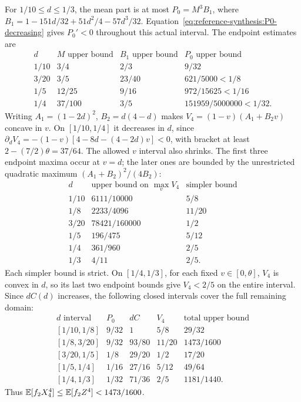 For $1/10\le d\le1/3$, the mean part is at most
$P_0=M^3B_1$, where $B_1=1-151d/32+51d^2/4-57d^3/32$.
Equation~\eqref{eq:reference-synthesis:P0-decreasing} gives
\(P_0'<0\) throughout this actual interval.
The endpoint estimates are
\[
\begin{array}{c|rrr}
d&M\text{ upper bound}&B_1\text{ upper bound}&P_0\text{ upper bound}\\\hline
1/10&3/4&2/3&9/32\\
3/20&3/5&23/40&621/5000<1/8\\
1/5&12/25&9/16&972/15625<1/16\\
1/4&37/100&3/5&151959/5000000<1/32.
\end{array}
\]
Writing $A_1=(1-2d)^2$, $B_2=d(4-d)$ makes $V_4=(1-v)(A_1+B_2v)$
concave in $v$. On $[1/10,1/4]$ it decreases in $d$, since
$\partial_dV_4=-(1-v)[4-8d-(4-2d)v]<0$, with bracket at least
$2-(7/2)\theta=37/64$. The allowed $v$ interval also shrinks.
The first three endpoint maxima occur at $v=d$; the later ones are
bounded by the unrestricted quadratic maximum $(A_1+B_2)^2/(4B_2)$:
\[
\begin{array}{c|rr}
d&\text{upper bound on }\max_vV_4&\text{simpler bound}\\\hline
1/10&6111/10000&5/8\\1/8&2233/4096&11/20\\
3/20&78421/160000&1/2\\1/5&196/475&5/12\\
1/4&361/960&2/5\\1/3&4/11&2/5.
\end{array}
\]
Each simpler bound is strict. On $[1/4,1/3]$, for each fixed
$v\in[0,\theta]$, $V_4$ is convex in $d$, so its last two endpoint
bounds give $V_4<2/5$ on the entire interval. Since $dC(d)$ increases,
the following closed intervals cover the full remaining domain:
\[
\begin{array}{c|rrrr}
d\text{ interval}&P_0&dC&V_4&\text{total upper bound}\\\hline
{}[1/10,1/8]&9/32&1&5/8&29/32\\
{}[1/8,3/20]&9/32&93/80&11/20&1473/1600\\
{}[3/20,1/5]&1/8&29/20&1/2&17/20\\
{}[1/5,1/4]&1/16&27/16&5/12&49/64\\
{}[1/4,1/3]&1/32&71/36&2/5&1181/1440.
\end{array}
\]
Thus $\mathbb E[f_2X_4^4]\le\mathbb E[f_2Z^4]<1473/1600$.

